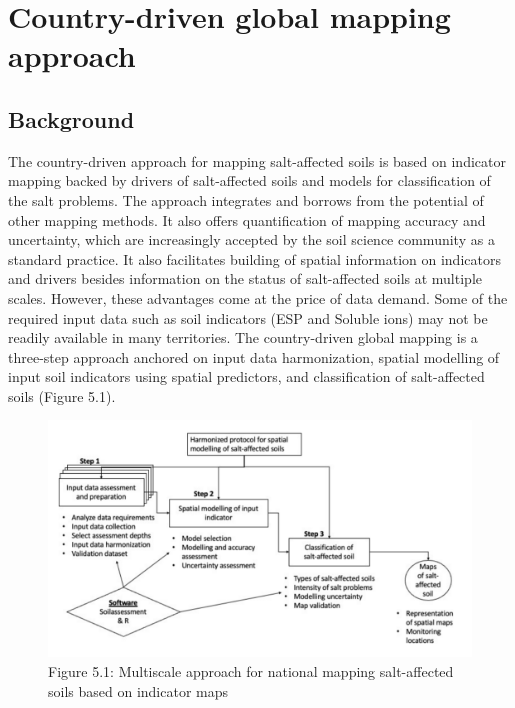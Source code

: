 \documentclass[
  10pt,
  b5paper,
]{book}
\begin{document}
\hypertarget{country-driven-global-mapping-approach}{%
\chapter{Country-driven global mapping approach}\label{country-driven-global-mapping-approach}}

\hypertarget{background}{%
\section{Background}\label{background}}

The country-driven approach for mapping salt-affected soils is based on indicator mapping backed by drivers of salt-affected soils and models for classification of the salt problems. The approach integrates and borrows from the potential of other mapping methods. It also offers quantification of mapping accuracy and uncertainty, which are increasingly accepted by the soil science community as a standard practice. It also facilitates building of spatial information on indicators and drivers besides information on the status of salt-affected soils at multiple scales. However, these advantages come at the price of data demand. Some of the required input data such as soil indicators (ESP and Soluble ions) may not be readily available in many territories.
The country-driven global mapping is a three-step approach anchored on input data harmonization, spatial modelling of input soil indicators using spatial predictors, and classification of salt-affected soils (Figure 5.1).

\begin{figure}
\centering
\includegraphics{figures/images/Figure4.15.PNG}
\caption{Figure 5.1: Multiscale approach for national mapping salt-affected soils based on indicator maps}
\end{figure}
\end{document}
